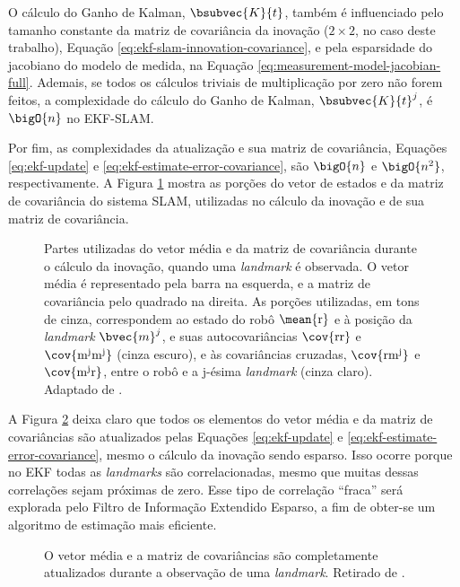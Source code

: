 O cálculo do Ganho de Kalman, $\bsubvec{K}{t}$, também é influenciado pelo 
tamanho constante da matriz de covariância da inovação ($2\times 2$, no caso deste trabalho), Equação \ref{eq:ekf-slam-innovation-covariance}, e pela esparsidade do jacobiano do modelo de medida, na Equação \ref{eq:measurement-model-jacobian-full}. Ademais, se todos os cálculos triviais de multiplicação por zero não forem feitos, a complexidade do cálculo do Ganho de Kalman, $\bsubvec{K}{t}^j$, é $\bigO{n}$ no EKF-SLAM.

Por fim, as complexidades da atualização e sua matriz de covariância, Equações \ref{eq:ekf-update} e \ref{eq:ekf-estimate-error-covariance}, são $\bigO{n}$ e $\bigO{n^2}$, respectivamente. A Figura \ref{fig:ekf-slam-innovation} mostra as porções 
do vetor de estados e da matriz de covariância do sistema SLAM, utilizadas no cálculo da inovação e de sua matriz de covariância.

\begin{figure}[h]
  \centering
  
  \caption{Partes utilizadas do vetor média e da matriz de covariância durante o cálculo da inovação, quando uma \textit{landmark} é observada. O vetor média é representado pela barra na esquerda, e a matriz de covariância pelo quadrado na direita. As porções utilizadas, em tons de cinza, correspondem ao estado do robô $\mean{\mathrm{r}}$ e à posição da \textit{landmark} $\bvec{m}^j$, e suas autocovariâncias $\cov{\mathrm{rr}}$ e $\cov{\mathrm{m^j m^j}}$ (cinza escuro), e às covariâncias cruzadas, $\cov{\mathrm{r m^j}}$ e $\cov{\mathrm{m^j r}}$, entre o robô e a j-ésima \textit{landmark} (cinza claro). Adaptado de \cite[p.~8]{jsola}.}
  \label{fig:ekf-slam-innovation}
\end{figure}

A Figura \ref{fig:ekf-slam-update} deixa claro que todos os elementos do vetor média e da 
matriz de covariâncias são atualizados pelas Equações \ref{eq:ekf-update} e \ref{eq:ekf-estimate-error-covariance}, mesmo o cálculo da inovação sendo esparso. Isso ocorre porque no EKF todas as \textit{landmarks} são 
correlacionadas, mesmo que muitas dessas correlações sejam próximas de zero. 
Esse tipo de correlação ``fraca'' será explorada pelo Filtro de Informação Extendido Esparso, a fim de obter-se um algoritmo de estimação mais eficiente.

\begin{figure}[h]
  \centering
  
  \caption{O vetor média e a matriz de covariâncias são completamente atualizados durante a observação de uma \textit{landmark}. Retirado de \cite[p.~8]{jsola}.}
  \label{fig:ekf-slam-update}
\end{figure}

